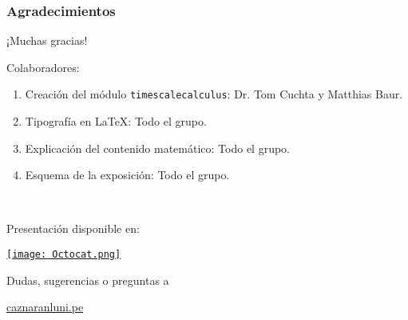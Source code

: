\begin{frame}
\frametitle{Agradecimientos}

\begin{center}\Large
	¡Muchas gracias!
\end{center}

Colaboradores:

\begin{enumerate}
	\item Creación del módulo \texttt{timescalecalculus}: Dr. Tom Cuchta y Matthias Baur.
	\item Tipografía en \LaTeX{}: Todo el grupo.
	\item Explicación del contenido matemático: Todo el grupo.
	\item Esquema de la exposición: Todo el grupo.
\end{enumerate}

\

{
\color{DarkBlue}
Presentación disponible en:
}
\begin{center}
\href{https://github.com/carlosal1015/Real-Analysis-Project}{\texttt{[image: Octocat.png]}}
\end{center}
\hfill
\begin{flushright}
Dudas, sugerencias o preguntas a

\href{mailto:caznaranl@uni.pe}{caznaranl\MVAt uni.pe}
\end{flushright}
\end{frame}
